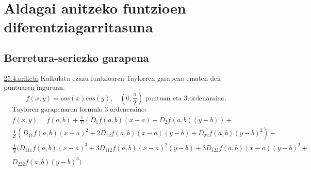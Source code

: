 \chapter{Aldagai anitzeko funtzioen diferentziagarritasuna}
\section{Berretura-seriezko garapena}
\underline{25.4.ariketa} Kalkulatu ezazu funtzioaren Taylorren garapena ematen den puntuaren inguruan.
\begin{equation*}
    f(x,y)=cos(x)cos(y), \quad (0,\frac{\pi}{2}) \text{ puntuan eta 3.ordenaraino.}
\end{equation*}
\begin{equation*}
\begin{split}
    &\text{Tayloren garapenaren formula 3.ordeneraino:}\\
    &f(x,y)=f(a,b)+\frac{1}{1!}(D_1f(a,b)(x-a)+D_2f(a,b)(y-b))+\\
    &\frac{1}{2!}(D_{11}f(a,b)(x-a)^2 +2 D_{12}f(a,b)(x-a)(y-b)+D_{22}f(a,b)(y-b)^2)+\\
    &\frac{1}{3|}(D_{111}f(a,b)(x-a)^3+3D_{112}f(a,b)(x-a)^2(y-b)+3D_{122}f(a,b)(x-a)(y-b)^2+\\
    &D_{222}f(a,b)(y-b)^3)\\
\end{split}
\end{equation*}

